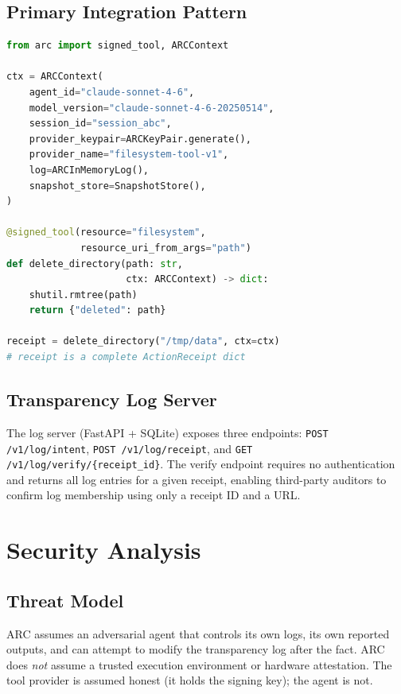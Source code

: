\documentclass[10pt,twocolumn]{article}
\begin{document}
\subsection{Primary Integration Pattern}

\begin{lstlisting}[language=Python]
from arc import signed_tool, ARCContext

ctx = ARCContext(
    agent_id="claude-sonnet-4-6",
    model_version="claude-sonnet-4-6-20250514",
    session_id="session_abc",
    provider_keypair=ARCKeyPair.generate(),
    provider_name="filesystem-tool-v1",
    log=ARCInMemoryLog(),
    snapshot_store=SnapshotStore(),
)

@signed_tool(resource="filesystem",
             resource_uri_from_args="path")
def delete_directory(path: str,
                     ctx: ARCContext) -> dict:
    shutil.rmtree(path)
    return {"deleted": path}

receipt = delete_directory("/tmp/data", ctx=ctx)
# receipt is a complete ActionReceipt dict
\end{lstlisting}

\subsection{Transparency Log Server}

The log server (FastAPI + SQLite) exposes three endpoints:
\texttt{POST /v1/log/intent},
\texttt{POST /v1/log/receipt}, and
\texttt{GET /v1/log/verify/\{receipt\_id\}}.
The verify endpoint requires no authentication and returns all log entries
for a given receipt, enabling third-party auditors to confirm log membership
using only a receipt ID and a URL.

\section{Security Analysis}

\subsection{Threat Model}

ARC assumes an adversarial agent that controls its own logs, its own
reported outputs, and can attempt to modify the transparency log after the
fact. ARC does \emph{not} assume a trusted execution environment or hardware
attestation. The tool provider is assumed honest (it holds the signing key);
the agent is not.
\end{document}
